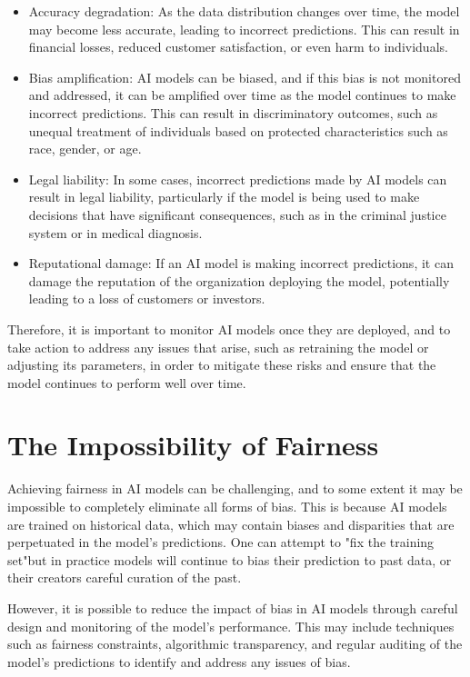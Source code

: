 \begin{itemize}
\item Accuracy degradation: As the data distribution changes over time, the model may become less accurate, leading to incorrect predictions. This can result in financial losses, reduced customer satisfaction, or even harm to individuals.
\item Bias amplification: AI models can be biased, and if this bias is not monitored and addressed, it can be amplified over time as the model continues to make incorrect predictions. This can result in discriminatory outcomes, such as unequal treatment of individuals based on protected characteristics such as race, gender, or age.
\item Legal liability: In some cases, incorrect predictions made by AI models can result in legal liability, particularly if the model is being used to make decisions that have significant consequences, such as in the criminal justice system or in medical diagnosis.
\item Reputational damage: If an AI model is making incorrect predictions, it can damage the reputation of the organization deploying the model, potentially leading to a loss of customers or investors.
\end{itemize}

Therefore, it is important to monitor AI models once they are deployed, and to take action to address any issues that arise, such as retraining the model or adjusting its parameters, in order to mitigate these risks and ensure that the model continues to perform well over time.

\section{The Impossibility of Fairness}

Achieving fairness in AI models can be challenging, and to some extent it may be impossible to completely eliminate all forms of bias. This is because AI models are trained on historical data, which may contain biases and disparities that are perpetuated in the model's predictions. One can attempt to "fix the training set"but in practice models will continue to bias their prediction to past data, or their creators careful curation of the past. 

However, it is possible to reduce the impact of bias in AI models through careful design and monitoring of the model's performance. This may include techniques such as fairness constraints, algorithmic transparency, and regular auditing of the model's predictions to identify and address any issues of bias.

